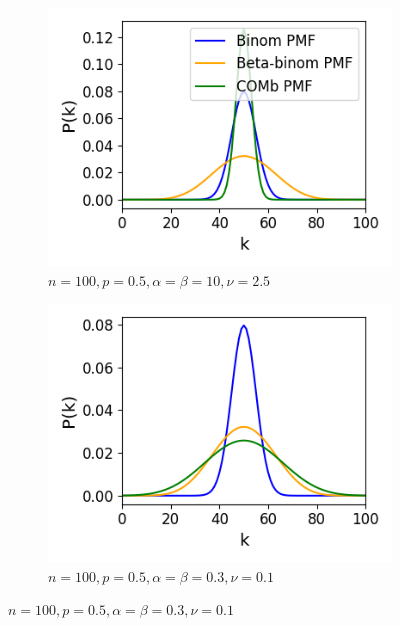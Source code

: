       \begin{figure}[p]
        \begin{subfigure}[h]{0.5\linewidth}
          \includegraphics[width=\textwidth]{figures/conway_maxwell/comb_underdispersion.png}
          \caption{$n=100, p=0.5, \alpha=\beta=10, \nu=2.5$}
          \label{fig:comb_underdispersion}
        \end{subfigure}
        \begin{subfigure}[h]{0.5\linewidth}
          \includegraphics[width=\textwidth]{figures/conway_maxwell/comb_overrdispersion.png}
          \caption{$n=100, p=0.5, \alpha=\beta=0.3, \nu=0.1$}
          \label{fig:comb_overrdispersion}
        \end{subfigure}

\end{figure}
